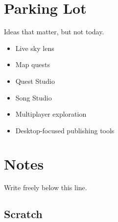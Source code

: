 \documentclass[11pt]{article}
\begin{document}
\section{Parking Lot}
\label{sec:org5b60768}

Ideas that matter, but not today.

\begin{itemize}
\item Live sky lens
\item Map quests
\item Quest Studio
\item Song Studio
\item Multiplayer exploration
\item Desktop-focused publishing tools
\end{itemize}
\section{Notes}
\label{sec:orgad65a90}

Write freely below this line.
\subsection{Scratch}
\label{sec:org5c1d2e7}
\end{document}
